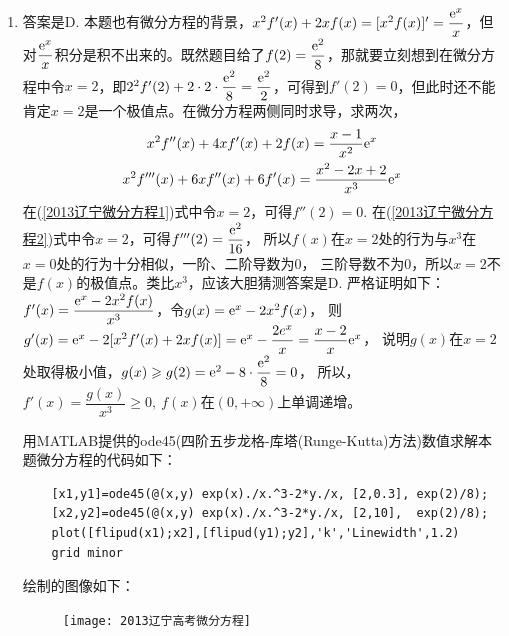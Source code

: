 \begin{enumerate}[label={\textbf{\arabic*.}},leftmargin=
    \inteval{\myenumleftmargin}pt]
\item  
答案是D. 本题也有微分方程的背景，$ x^2f'(x)+2xf(x)=[x^2f(x)]'=\dfrac{\mathrm{e}^x}{x} $，但对$ \dfrac{\mathrm{e}^x}{x} $积分是积不出来的。既然题目给了$ f(2)=\dfrac{\mathrm{e}^2}{8} $，那就要立刻想到在微分方程中令$ x=2 $，即$ 2^2f'(2)+2\cdot 2\cdot \dfrac{\mathrm{e}^2}{8}=\dfrac{\mathrm{e}^2}{2} $，可得到$ f'(2)=0 $，但此时还不能肯定$ x=2 $是一个极值点。在微分方程两侧同时求导，求两次，
\begin{gather}
    x^2f''(x)+4xf'(x)+2f(x)=\dfrac{x-1}{x^2}\mathrm{e}^x \label{2013辽宁微分方程1} \\
    x^2f'''(x)+6xf''(x)+6f'(x)=\dfrac{x^2-2x+2}{x^3}\mathrm{e}^x  \label{2013辽宁微分方程2}
\end{gather}
在(\ref{2013辽宁微分方程1})式中令$ x=2 $，可得$ f''(2)=0 $. 
在(\ref{2013辽宁微分方程2})式中令$ x=2 $，可得$ f'''(2)=\dfrac{\mathrm{e}^2}{16} $，
所以$ f(x) $在$ x=2 $处的行为与$ x^3 $在$ x=0 $处的行为十分相似，一阶、二阶导数为0，
三阶导数不为0，所以$ x=2 $不是$ f(x) $的极值点。类比$ x^3 $，应该大胆猜测答案是D.
严格证明如下：$ f'(x)=\dfrac{\mathrm{e}^x-2x^2f(x)}{x^3} $，令$ g(x)=\mathrm{e}^x-2x^2f(x) $，
则$ g'(x)=\mathrm{e}^x-2[x^2f'(x)+2xf(x)]=\mathrm{e}^x-\dfrac{2e^x}{x}=\dfrac{x-2}{x}\mathrm{e}^x $，
说明$ g(x) $在$ x=2 $处取得极小值，$ g(x)\geqslant g(2)=\mathrm{e}^2-8\cdot \dfrac{\mathrm{e}^2}{8}=0 $，
所以，$ f'(x)=\dfrac{g(x)}{x^3}\geq 0,\ f(x) $在$ (0,+\infty) $上单调递增。

用MATLAB提供的ode45(四阶五步龙格-库塔(Runge-Kutta)方法)数值求解本题微分方程的代码如下：
\begin{lstlisting}
    [x1,y1]=ode45(@(x,y) exp(x)./x.^3-2*y./x, [2,0.3], exp(2)/8);
    [x2,y2]=ode45(@(x,y) exp(x)./x.^3-2*y./x, [2,10],  exp(2)/8);
    plot([flipud(x1);x2],[flipud(y1);y2],'k','Linewidth',1.2)
    grid minor
\end{lstlisting} 
绘制的图像如下：
\begin{figure}[!htbp]
    \centering
    \texttt{[image: 2013辽宁高考微分方程]}
\end{figure}


\end{enumerate}
